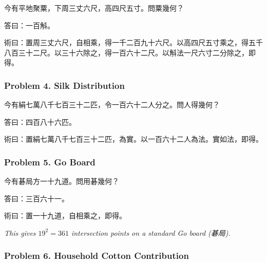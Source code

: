 \documentclass[11pt,a4paper]{article}
\newcommand{\zh}[1]{{\CJKfamily{}#1}}
\begin{document}
\begin{problembox}[title=\zh{問}]
\zh{今有平地聚粟，下周三丈六尺，高四尺五寸。問粟幾何？}
\end{problembox}
\begin{answerbox}[title=\zh{答}]
\zh{答曰：一百斛。}
\end{answerbox}
\begin{methodbox}[title=\zh{術}]
\zh{術曰：置周三丈六尺，自相乘，得一千二百九十六尺。以高四尺五寸乘之，得五千八百三十二尺。以三十六除之，得一百六十二尺。以斛法一尺六寸二分除之，即得。}
\end{methodbox}

\subsubsection*{Problem 4. Silk Distribution}

\begin{problembox}[title=\zh{問}]
\zh{今有絹七萬八千七百三十二匹，令一百六十二人分之。問人得幾何？}
\end{problembox}
\begin{answerbox}[title=\zh{答}]
\zh{答曰：四百八十六匹。}
\end{answerbox}
\begin{methodbox}[title=\zh{術}]
\zh{術曰：置絹七萬八千七百三十二匹，為實。以一百六十二人為法。實如法，即得。}
\end{methodbox}

\subsubsection*{Problem 5. Go Board}

\begin{problembox}[title=\zh{問}]
\zh{今有碁局方一十九道。問用碁幾何？}
\end{problembox}
\begin{answerbox}[title=\zh{答}]
\zh{答曰：三百六十一。}
\end{answerbox}
\begin{methodbox}[title=\zh{術}]
\zh{術曰：置一十九道，自相乘之，即得。}
\end{methodbox}

\textit{This gives $19^2 = 361$ intersection points on a standard Go board (\zh{碁局}).}

\subsubsection*{Problem 6. Household Cotton Contribution}
\end{document}

